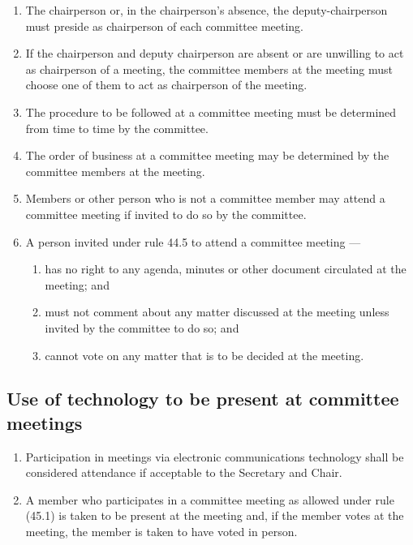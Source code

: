 \documentclass[../constitution.tex]{subfiles}
\begin{document}
\begin{enumerate}

\item The chairperson or, in the chairperson's absence, the deputy-chairperson must preside as chairperson of each committee meeting.
\item If the chairperson and deputy chairperson are absent or are unwilling to act as chairperson of a meeting, the committee members at the meeting must choose one of them to act as chairperson of the meeting.
\item The procedure to be followed at a committee meeting must be determined from time to time by the committee.
\item The order of business at a committee meeting may be determined by the committee members at the meeting.
\item Members or other person who is not a committee member may attend a committee meeting if invited to do so by the committee.
\item A person invited under rule 44.5 to attend a committee meeting ---

  \begin{enumerate}
  
  \item has no right to any agenda, minutes or other document circulated at the meeting; and
  \item must not comment about any matter discussed at the meeting unless invited by the committee to do so; and
  \item cannot vote on any matter that is to be decided at the meeting.
  \end{enumerate}
\end{enumerate}

\hypertarget{use-of-technology-to-be-present-at-committee-meetings}{%
\subsection{Use of technology to be present at committee meetings}\label{use-of-technology-to-be-present-at-committee-meetings}}

\begin{enumerate}

\item Participation in meetings via electronic communications technology shall be considered attendance if acceptable to the Secretary and Chair.
\item A member who participates in a committee meeting as allowed under rule (45.1) is taken to be present at the meeting and, if the member votes at the meeting, the member is taken to have voted in person.
\end{enumerate}
\end{document}
